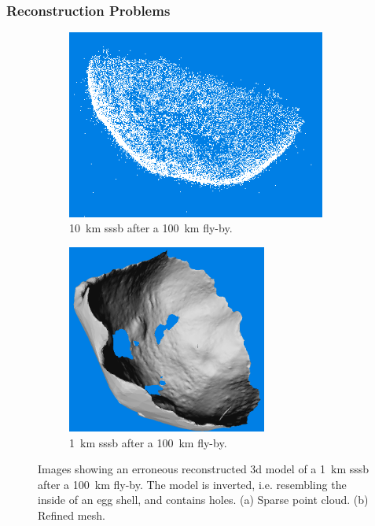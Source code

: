 \subsubsection{Reconstruction Problems} \label{sec:recon_problems}
\begin{figure}[htb]
    \centering
        \begin{subfigure}[b]{0.42\textwidth}
            \centering
            \includegraphics[width=\textwidth,height=6.2cm]{doc/thesis/0_figures/models_quality/broken/broken_points1.png}
            \caption{\SI{10}{\kilo\meter} \gls{sssb} after a \SI{100}{\kilo\meter} fly-by.} %
            \label{fig:models_broken_points}
        \end{subfigure}
        \begin{subfigure}[b]{0.42\textwidth}
            \centering
            \includegraphics[width=\textwidth,height=6.2cm]{doc/thesis/0_figures/models_quality/broken/broken_refine2.png}
            \caption{\SI{1}{\kilo\meter} \gls{sssb} after a \SI{100}{\kilo\meter} fly-by.}
            \label{fig:models_broken_mesh}
        \end{subfigure}
    \caption{Images showing an erroneous reconstructed \gls{3d} model of a \SI{1}{\kilo\meter} \gls{sssb} after a \SI{100}{\kilo\meter} fly-by. The model is inverted, i.e. resembling the inside of an egg shell, and contains holes. (a) Sparse point cloud. (b) Refined mesh.}
    \label{fig:models_broken}
\end{figure}

